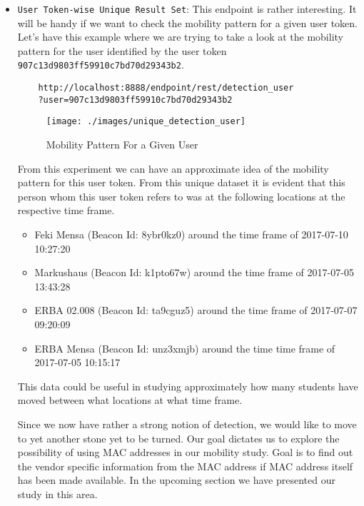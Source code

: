 \begin{itemize}
	\item \texttt{User Token-wise Unique Result Set}: This endpoint is rather interesting. It will be handy if we want to check the mobility pattern for a given user token. Let's have this example where we are trying to take a look at the mobility pattern for the user identified by the user token \texttt{907c13d9803ff59910c7bd70d29343b2}.
	\begin{verbatim}
	http://localhost:8888/endpoint/rest/detection_user
	?user=907c13d9803ff59910c7bd70d29343b2
	\end{verbatim}
	\begin{figure}[H]
		\centering
		\texttt{[image: ./images/unique\_detection\_user]}
		\caption{Mobility Pattern For a Given User}
		\label{figure1:mobility_pattern_for_given_user}
	\end{figure}
	From this experiment we can have an approximate idea of the mobility pattern for this user token. From this unique dataset it is evident that this person whom this user token refers to was at the following locations at the respective time frame.
	\begin{itemize}
		\item Feki Mensa (Beacon Id: 8ybr0kz0) around the time frame of 2017-07-10 10:27:20
		\item Markushaus (Beacon Id: k1pto67w) around the time frame of 2017-07-05 13:43:28
		\item ERBA 02.008 (Beacon Id: ta9cguz5) around the time frame of 2017-07-07 09:20:09
		\item ERBA Mensa (Beacon Id: unz3xmjb) around the time time frame of 2017-07-05 10:15:17
	\end{itemize}
	This data could be useful in studying approximately how many students have moved between what locations at what time frame.
	
	\par Since we now have rather a strong notion of detection, we would like to move to yet another stone yet to be turned. Our goal dictates us to explore the possibility of using MAC addresses in our mobility study. Goal is to find out the vendor specific information from the MAC address if MAC address itself has been made available. In the upcoming section we have presented our study in this area.
	
\end{itemize}






   

